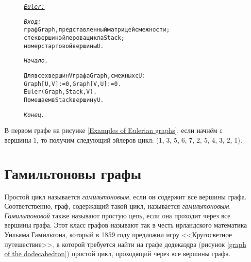 \begin{figure}[h]
	\begin{alltt}
\textit{\underline{Euler:}}

\textit{Вход:}
  граф Graph, представленный матрицей смежности;
  стек вершин эйлерова цикла Stack;
  номер стартовой вершины U.

\textit{Начало.}

  Для всех вершин V графа Graph, смежных с U:
    Graph[U,V] := 0, Graph[V,U] := 0.
    Euler(Graph, Stack, V).
  Помещаем в Stack вершину U.

\textit{Конец.}
	\end{alltt}
\end{figure}

В первом графе на рисунке \ref{Examples of Eulerian graphs}, если начнём с 
вершины 1, то получим следующий эйлеров цикл: (1, 3, 5, 6, 7, 2, 5, 4, 3, 2, 1).

\section{Гамильтоновы графы}

Простой цикл называется \emph{гамильтоновым}, если он содержит все вершины 
графа. Соответственно, граф, содержащий такой цикл, называется 
\emph{гамильтоновым}. \emph{Гамильтоновой} также называют простую цепь, если 
она проходит через все вершины графа. Этот класс графов называют так в честь 
ирландского математика Уильяма Гамильтона, который в 1859 году предложил игру 
<<Кругосветное путешествие>>, в которой требуется найти на графе додекаэдра 
(рисунок \ref{graph of the dodecahedron}) простой цикл, проходящий через все 
вершины 
графа.

